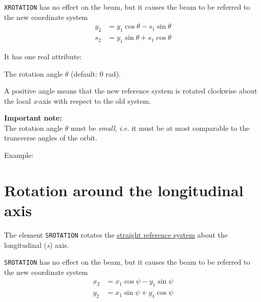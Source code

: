 
\texttt{XROTATION} has no effect on the beam, but it
causes the beam to be referred to the new coordinate system  \\
\begin{equation}\begin{split}
y_2 &= y_1 \cos\theta - s_1 \sin\theta \\
s_2 &= y_1 \sin\theta + s_1 \cos\theta
\end{split}\end{equation}

It has one real attribute:
\begin{madlist}
	 The rotation angle $\theta$ (default: 0 rad).
\end{madlist}

A positive angle means that the new reference system is rotated
clockwise about the local \textit{x}-axis with respect to the old system.

\textbf{Important note:} \\
The rotation angle $\theta$ must be \emph{small}, \textsl{i.e.} it must be at
most comparable to the transverse angles of the orbit.

Example:

\section{Rotation around the longitudinal axis}
\label{sec:srotation}

The element \texttt{SROTATION} rotates the
\hyperref[subsec:local-straight]{straight reference system} about the
longitudinal (\textit{s}) axis.


\texttt{SROTATION} has no effect on the beam, but it causes the beam to be
referred to the new coordinate system \\
\begin{equation}\begin{split}
x_2 &= x_1 \cos\psi - y_1 \sin\psi \\
y_2 &= x_1 \sin\psi + y_1 \cos\psi
\end{split}\end{equation}

